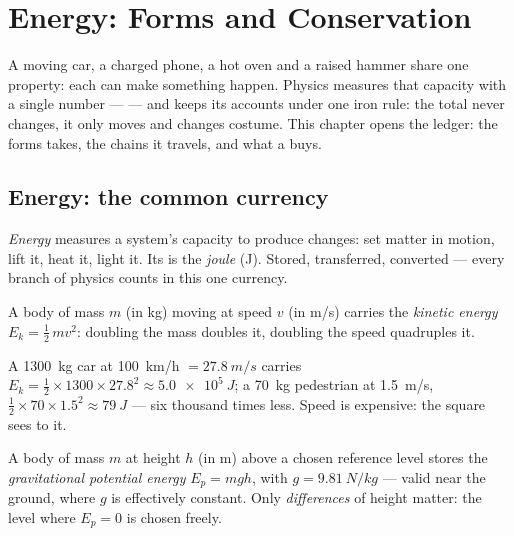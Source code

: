\chapter{Energy: Forms and Conservation}\label{ch:g10:energy-conservation}

A moving car, a charged phone, a hot oven and a raised hammer share
one property: each can make something happen. Physics measures that
capacity with a single number ---  --- and keeps its accounts
under one iron rule: the total never changes, it only moves and
changes costume. This chapter opens the ledger: the forms 
takes, the chains it travels, and what a  buys.

\section{Energy: the common currency}

\begin{definition}\label{def:g10:energy-conservation:energy}
\emph{Energy} measures a system's capacity to produce
changes: set matter in motion, lift it, heat it, light it. Its 
is the \emph{joule} (\unit{J}). Stored, transferred,
converted --- every branch of physics counts in this one currency.
\end{definition}

\begin{definition}\label{def:g10:energy-conservation:kinetic}
A body of mass $m$ (in \unit{kg}) moving at speed $v$ (in
\unit{m/s}) carries the \emph{kinetic energy}
$E_k = \tfrac12\, m v^2$: doubling the mass doubles it, doubling
the speed quadruples it.
\end{definition}

\begin{example}\label{ex:g10:energy-conservation:kinetic}
A \qty{1300}{kg} car at \qty{100}{km/h} $= \qty{27.8}{m/s}$ carries
$E_k = \tfrac12 \times 1300 \times 27.8^2 \approx \qty{5.0e5}{J}$;
a \qty{70}{kg} pedestrian at \qty{1.5}{m/s},
$\tfrac12 \times 70 \times 1.5^2 \approx \qty{79}{J}$ --- six
thousand times less. Speed is expensive: the square sees to it.
\end{example}

\begin{definition}\label{def:g10:energy-conservation:potential}
A body of mass $m$ at height $h$ (in \unit{m}) above a chosen
reference level stores the \emph{gravitational potential
energy} $E_p = m g h$, with
$g = \qty{9.81}{N/kg}$ --- valid near the ground, where $g$ is
effectively constant. Only \emph{differences} of height matter: the
level where $E_p = 0$ is chosen freely.
\end{definition}

